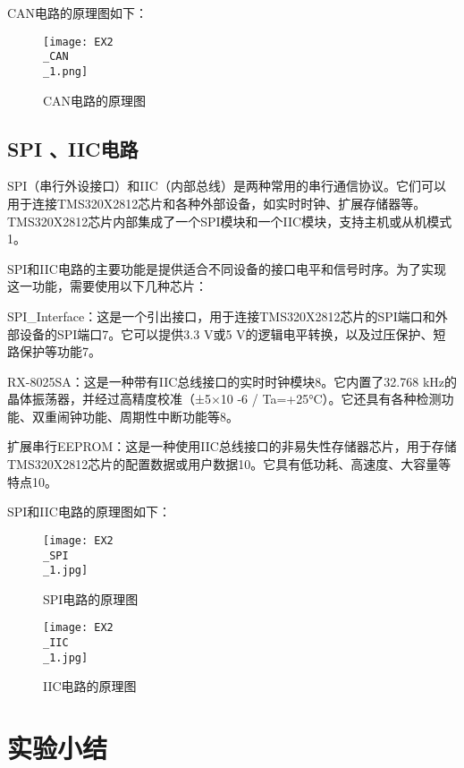 \documentclass{math201}
\begin{document}
CAN电路的原理图如下：

\begin{figure}[H]  
  \centering\texttt{[image: EX2\\\_CAN\\\_1.png]}  
  \caption{CAN电路的原理图}     
\end{figure}

\subsection{SPI 、IIC电路}

SPI（串行外设接口）和IIC（内部总线）是两种常用的串行通信协议。它们可以用于连接TMS320X2812芯片和各种外部设备，如实时时钟、扩展存储器等。TMS320X2812芯片内部集成了一个SPI模块和一个IIC模块，支持主机或从机模式1。

SPI和IIC电路的主要功能是提供适合不同设备的接口电平和信号时序。为了实现这一功能，需要使用以下几种芯片：

SPI\_Interface：这是一个引出接口，用于连接TMS320X2812芯片的SPI端口和外部设备的SPI端口7。它可以提供3.3 V或5 V的逻辑电平转换，以及过压保护、短路保护等功能7。

RX-8025SA：这是一种带有IIC总线接口的实时时钟模块8。它内置了32.768 kHz的晶体振荡器，并经过高精度校准（±5×10 -6 / Ta=+25°C）。它还具有各种检测功能、双重闹钟功能、周期性中断功能等8。

扩展串行EEPROM：这是一种使用IIC总线接口的非易失性存储器芯片，用于存储TMS320X2812芯片的配置数据或用户数据10。它具有低功耗、高速度、大容量等特点10。

SPI和IIC电路的原理图如下：

\begin{figure}[H]  
  \centering\texttt{[image: EX2\\\_SPI\\\_1.jpg]}  
  \caption{SPI电路的原理图}     
\end{figure}

\begin{figure}[H]  
  \centering\texttt{[image: EX2\\\_IIC\\\_1.jpg]}  
  \caption{IIC电路的原理图}     
\end{figure}

\section{实验小结}
\end{document}
